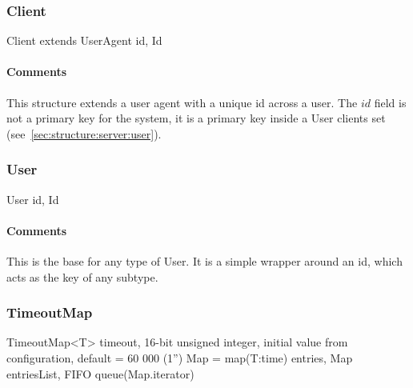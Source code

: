 \documentclass[a4paper,10pt]{article}
\begin{document}
\subsubsection{Client}

\begin{verbbox}
Client extends UserAgent
{
  id, Id
}
\end{verbbox}
\begin{center}
\theverbbox
\end{center}

\begin{inparaitem}[ ]
 \item \infrastructure
\end{inparaitem}

\paragraph*{Comments}
This structure extends a user agent with a unique id across a user. The $id$ field is not a primary key for the system, it is a primary key inside a User clients set
(see~\ref{sec:structure:server:user}).

\subsubsection{User}

\begin{verbbox}
User
{
  id, Id
}
\end{verbbox}
\begin{center}
\theverbbox
\end{center}

\begin{inparaitem}[ ]
 \item \infrastructure
\end{inparaitem}

\paragraph*{Comments}
This is the base for any type of User. It is a simple wrapper around an id, which acts as the key of any subtype.

\subsubsection{TimeoutMap}

\begin{verbbox}
TimeoutMap<T>
{
  timeout, 16-bit unsigned integer,
    initial value from configuration, default = 60 000 (1'')
  Map = map(T:time)
  entries, Map
  entriesList, FIFO queue(Map.iterator)
}
\end{verbbox}
\begin{center}
\theverbbox
\end{center}
\end{document}
